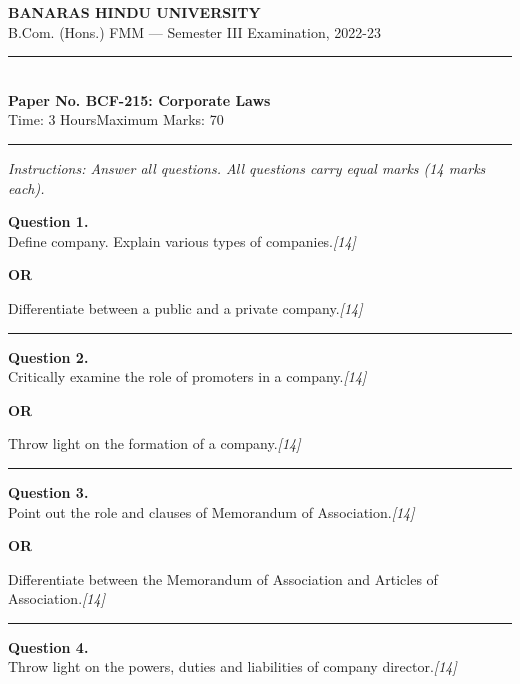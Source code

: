 \documentclass[11pt,a4paper]{article}
\newcommand{\pts}[1]{\hfill   \textit{[#1]}}
\begin{document}
\begin{center}
  {\large\bfseries BANARAS HINDU UNIVERSITY}\\[2pt]
  {\normalsize B.Com. (Hons.) FMM --- Semester III Examination, 2022-23}\\[6pt]
  \rule{0.8\linewidth}{0.5pt}\\[6pt]
  {\large\bfseries Paper No. BCF-215: Corporate Laws}\\[4pt]
  {\normalsize Time: 3 Hours\hfill Maximum Marks: 70}
\end{center}

\rule{\linewidth}{0.4pt}

\smallskip



\noindent   \textit{Instructions: Answer all questions. All questions carry equal marks (14 marks each).}

\bigskip




\noindent   \textbf{Question 1.} \\
Define company. Explain various types of companies.\pts{14}

\centerline{   \textbf{OR}}

Differentiate between a public and a private company.\pts{14}

\medskip\rule{\linewidth}{0.2pt}




\noindent   \textbf{Question 2.} \\
Critically examine the role of promoters in a company.\pts{14}

\centerline{   \textbf{OR}}

Throw light on the formation of a company.\pts{14}

\medskip\rule{\linewidth}{0.2pt}




\noindent   \textbf{Question 3.} \\
Point out the role and clauses of Memorandum of Association.\pts{14}

\centerline{   \textbf{OR}}

Differentiate between the Memorandum of Association and Articles of Association.\pts{14}

\medskip\rule{\linewidth}{0.2pt}




\noindent   \textbf{Question 4.} \\
Throw light on the powers, duties and liabilities of company director.\pts{14}
\end{document}
